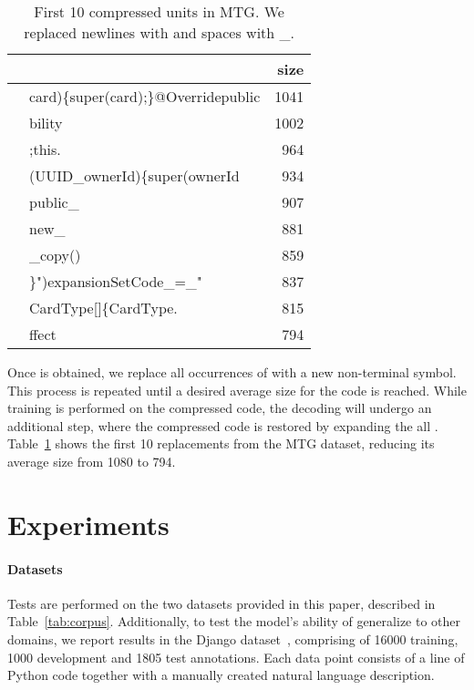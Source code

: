 \documentclass[11pt]{article}
\begin{document}
\begin{table}
\centering
\small
\begin{tabular}{@{}llr@{}}
  \toprule
 &  & size\\
  \midrule
 & card)\{super(card);\}@Overridepublic & 1041\\
 & bility & 1002\\
 & ;this. & 964\\
 & (UUID\_ownerId)\{super(ownerId & 934\\
 & public\_ & 907\\
 & new\_ & 881\\
 & \_copy() & 859\\
 & \}")expansionSetCode\_=\_" & 837\\
 & CardType[]\{CardType. & 815\\
 & ffect & 794\\
  \bottomrule
\end{tabular}
\caption{First 10 compressed units in MTG. We replaced newlines with  and spaces with \_.}\label{tab:compress}
\end{table}


Once  is obtained, we replace all occurrences of  with a new
non-terminal symbol. This process is repeated until a desired average size for the
code is reached. While training is performed on the compressed code, the
decoding will undergo an additional step, where the compressed code is restored
by expanding the all . Table~\ref{tab:compress} shows the first
10 replacements from the MTG dataset, reducing its average size from 1080 to 794.




\section{Experiments}
\label{sec:experiments}



\paragraph{Datasets} Tests are performed on the two datasets provided in this
paper, described in Table~\ref{tab:corpus}. Additionally, to test the model's
ability of generalize to other domains, we report results in the Django dataset~\cite{oda15ase},
comprising of 16000 training, 1000 development and 1805 test annotations. Each
data point consists of a line of Python code together with a manually created
natural language description.
\end{document}
